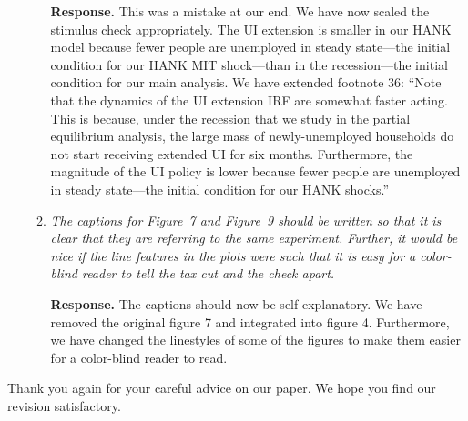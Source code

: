 \documentclass[12pt,letterpaper,english]{article}
\begin{document}
\begin{itemize}
\begin{enumerate}[start=2]
		\noindent \textbf{Response.} This was a mistake at our end. We have now scaled the stimulus check appropriately. The UI extension is smaller in our HANK model because fewer people are unemployed in steady state---the initial condition for our HANK MIT shock---than in the recession---the initial condition for our main analysis. We have extended footnote 36: ``Note that the dynamics of the UI extension IRF are somewhat faster acting.
		This is because, under the recession that we study in the partial equilibrium analysis, the large mass of newly-unemployed households do not start receiving extended UI for six months. Furthermore, the magnitude of the UI policy is lower because fewer people are unemployed in steady state---the initial condition for our HANK shocks.'' 
		
		\item \textit{The captions for Figure~7 and Figure~9 should be written so that it is clear that they are referring to the same experiment. Further, it would be nice if the line features in the plots were such that it is easy for a color-blind reader to tell the tax cut and the check apart.}
		
		\noindent \textbf{Response.}  	The captions should now be self explanatory. We have removed the original figure 7 and integrated into figure 4. Furthermore, we have changed the linestyles of some of the figures to make them easier for a color-blind reader to read.
			
	\end{enumerate}
	

	
\end{itemize}

	
	\bigskip
	
	\noindent Thank you again for your careful advice on our paper. We hope you find our revision satisfactory.
	


\end{document}
